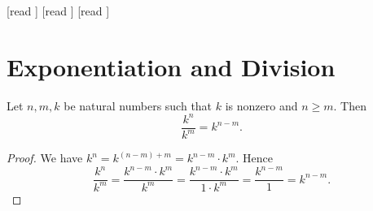\documentclass[10pt]{article}
\begin{document}
  \begin{imports}
    \begin{forthel}
      [read ]
      [read ]
      [read ]
    \end{forthel}
  \end{imports}


  \section*{Exponentiation and Division}

  \begin{forthel}
    \begin{proposition}[id=ARITHMETIC_14_2345102698451257,printid]
      Let $n, m, k$ be natural numbers such that $k$ is nonzero and $n \geq m$.
      Then \[\frac{k^{n}}{k^{m}} = k^{n - m}.\]
    \end{proposition}
    \begin{proof}
      We have $k^{n} = k^{(n - m) + m} = k^{n - m} \cdot k^{m}$.
      Hence
      \[  \frac{k^{n}}{k^{m}}
          = \frac{k^{n - m} \cdot k^{m}}{k^{m}}
          = \frac{k^{n - m} \cdot k^{m}}{1 \cdot k^{m}}
          = \frac{k^{n - m}}{1}
          = k^{n - m}. \]
    \end{proof}
  \end{forthel}
\end{document}
